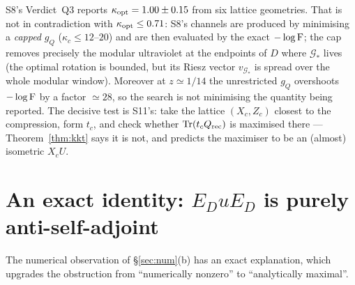 \documentclass[11pt]{article}
\begin{document}
\begin{remark}\label{rem:tension}
S8's Verdict~Q3 reports $\kappa_{\rm opt}=1.00\pm0.15$ from six lattice geometries.
That is not in contradiction with $\kappa_{\rm opt}\le0.71$: S8's channels are produced
by minimising a \emph{capped} $g_Q$ ($\kappa_c\le12$--$20$) and are then evaluated by the
exact $-\log\operatorname{F}$; the cap removes precisely the modular ultraviolet at the endpoints of
$D$ where $\mathcal G_*$ lives (the optimal rotation is bounded, but its Riesz vector
$v_{\mathcal G_*}$ is spread over the whole modular window).  Moreover at $z\simeq1/14$
the unrestricted $g_Q$ overshoots $-\log\operatorname{F}$ by a factor $\simeq28$, so the search is
not minimising the quantity being reported.  The decisive test is S11's: take the lattice
$(X_c,Z_c)$ closest to the compression, form $t_c$, and check whether
$\operatorname{Tr}(t_cQ_{\rm rec})$ is maximised there --- Theorem~\ref{thm:kkt} says it is not, and
predicts the maximiser to be an (almost) isometric $X_cU$.
\end{remark}

\section{An exact identity: $E_DuE_D$ is purely anti-self-adjoint}\label{sec:exact}

The numerical observation of \S\ref{sec:num}(b) has an exact explanation, which upgrades
the obstruction from ``numerically nonzero'' to ``analytically maximal''.
\end{document}

